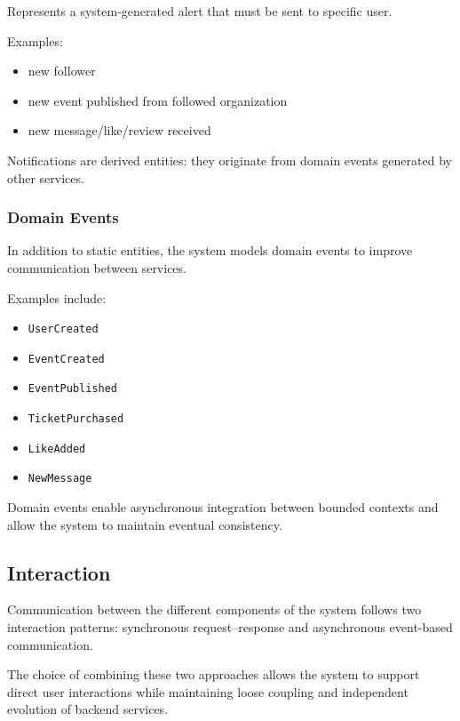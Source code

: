 Represents a system-generated alert that must be sent to specific user.

Examples:
\begin{itemize}
  \item new follower
  \item new event published from followed organization
  \item new message/like/review received
\end{itemize}

Notifications are derived entities: they originate from domain events generated by other services.

\subsubsection{Domain Events}

In addition to static entities, the system models domain events to improve communication between services.

Examples include:
\begin{itemize}
  \item \texttt{UserCreated}
  \item \texttt{EventCreated}
  \item \texttt{EventPublished}
  \item \texttt{TicketPurchased}
  \item \texttt{LikeAdded}
  \item \texttt{NewMessage}
\end{itemize}

Domain events enable asynchronous integration between bounded contexts and allow the system to maintain eventual consistency.

\subsection{Interaction}

Communication between the different components of the system follows two interaction patterns: synchronous request--response and asynchronous event-based communication.

The choice of combining these two approaches allows the system to support direct user interactions while maintaining loose coupling and independent evolution of backend services.

